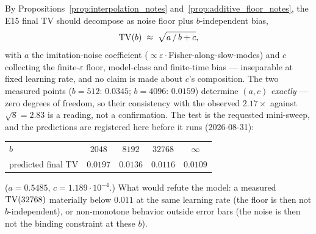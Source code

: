 \documentclass[11pt]{article}
\theoremstyle{definition}
\theoremstyle{remark}
\begin{document}
By Propositions~\ref{prop:interpolation_notes} and~\ref{prop:additive_floor_notes}, the E15 final
TV should decompose as noise floor plus $b$-independent bias,
\begin{equation}\label{equ:batch_model_notes}
    \mathrm{TV}(b) \;\approx\; \sqrt{a\,/\,b + c},
\end{equation}
with $a$ the imitation-noise coefficient ($\propto\varepsilon\cdot$Fisher-along-slow-modes)
and $c$ collecting the finite-$\varepsilon$ floor, model-class and finite-time bias ---
inseparable at fixed learning rate, and no claim is made about $c$'s composition. The two
measured points ($b=512$: $0.0345$; $b=4096$: $0.0159$) determine $(a,c)$ \emph{exactly}
--- zero degrees of freedom, so their consistency with the observed $2.17\times$ against
$\sqrt8=2.83$ is a reading, not a confirmation. The test is the requested mini-sweep,
and the predictions are registered here before it runs (2026-08-31):
\begin{center}
\begin{tabular}{lcccc}
$b$ & $2048$ & $8192$ & $32768$ & $\infty$\\
predicted final TV & $0.0197$ & $0.0136$ & $0.0116$ & $0.0109$\\
\end{tabular}
\end{center}
($a=0.5485$, $c=1.189\cdot10^{-4}$.) What would refute the model: a measured
$\mathrm{TV}(32768)$ materially below $0.011$ at the same learning rate (the floor is then not
$b$-independent), or non-monotone behavior outside error bars (the noise is then not the
binding constraint at these $b$).
\end{document}

